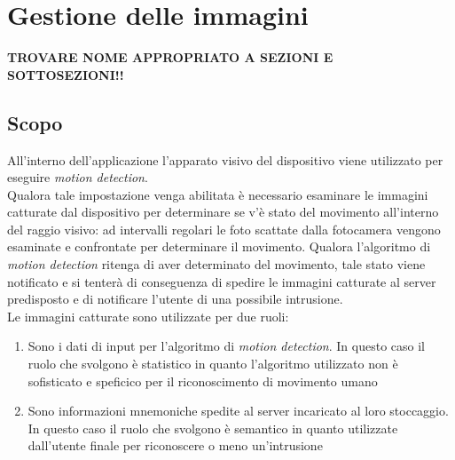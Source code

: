 \section{Gestione delle immagini}
\textbf{TROVARE NOME APPROPRIATO A SEZIONI E SOTTOSEZIONI!!}
\subsection{Scopo}
All'interno dell'applicazione l'apparato visivo del dispositivo viene utilizzato per eseguire \textit{motion detection}.\\
Qualora tale impostazione venga abilitata è necessario esaminare le immagini catturate dal dispositivo per determinare se v'è stato del movimento all'interno del raggio visivo: ad intervalli regolari le foto scattate dalla fotocamera vengono esaminate e confrontate per determinare il movimento. Qualora l'algoritmo di \textit{motion detection} ritenga di aver determinato del movimento, tale stato viene notificato e si tenterà di conseguenza di spedire le immagini catturate al server predisposto e di notificare l'utente di una possibile intrusione.\\

\noindent Le immagini catturate sono utilizzate per due ruoli:
\begin{enumerate}
  \item Sono i dati di input per l'algoritmo di \textit{motion detection}. In questo caso il ruolo che svolgono è statistico in quanto l'algoritmo utilizzato non è sofisticato e speficico per il riconoscimento di movimento umano
  \item Sono informazioni mnemoniche spedite al server incaricato al loro stoccaggio. In questo caso il ruolo che svolgono è semantico in quanto utilizzate dall'utente finale per riconoscere o meno un'intrusione
\end{enumerate}

